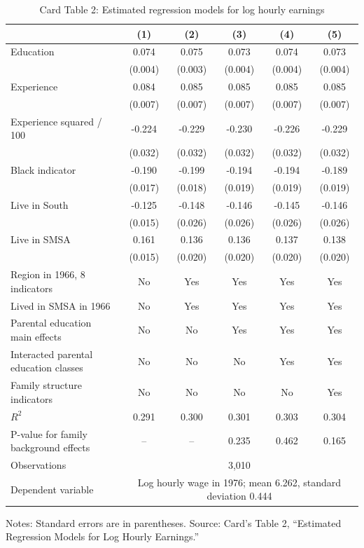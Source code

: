 \documentclass[11pt,a4paper]{article}
\begin{document}
\begin{table}[h!]
\centering
\caption{Card Table 2: Estimated regression models for log hourly earnings}
\begin{threeparttable}
\small
\begin{tabular}{lccccc}
\toprule
 & (1) & (2) & (3) & (4) & (5) \\
\midrule
Education & 0.074 & 0.075 & 0.073 & 0.074 & 0.073 \\
 & (0.004) & (0.003) & (0.004) & (0.004) & (0.004) \\
Experience & 0.084 & 0.085 & 0.085 & 0.085 & 0.085 \\
 & (0.007) & (0.007) & (0.007) & (0.007) & (0.007) \\
Experience squared / 100 & -0.224 & -0.229 & -0.230 & -0.226 & -0.229 \\
 & (0.032) & (0.032) & (0.032) & (0.032) & (0.032) \\
Black indicator & -0.190 & -0.199 & -0.194 & -0.194 & -0.189 \\
 & (0.017) & (0.018) & (0.019) & (0.019) & (0.019) \\
Live in South & -0.125 & -0.148 & -0.146 & -0.145 & -0.146 \\
 & (0.015) & (0.026) & (0.026) & (0.026) & (0.026) \\
Live in SMSA & 0.161 & 0.136 & 0.136 & 0.137 & 0.138 \\
 & (0.015) & (0.020) & (0.020) & (0.020) & (0.020) \\
\midrule
Region in 1966, 8 indicators & No & Yes & Yes & Yes & Yes \\
Lived in SMSA in 1966 & No & Yes & Yes & Yes & Yes \\
Parental education main effects & No & No & Yes & Yes & Yes \\
Interacted parental education classes & No & No & No & Yes & Yes \\
Family structure indicators & No & No & No & No & Yes \\
\midrule
\(R^2\) & 0.291 & 0.300 & 0.301 & 0.303 & 0.304 \\
P-value for family background effects & -- & -- & 0.235 & 0.462 & 0.165 \\
Observations & \multicolumn{5}{c}{3,010} \\
Dependent variable & \multicolumn{5}{c}{Log hourly wage in 1976; mean 6.262, standard deviation 0.444} \\
\bottomrule
\end{tabular}
\begin{tablenotes}[flushleft]
\footnotesize
\item Notes: Standard errors are in parentheses. Source: Card's Table 2, ``Estimated Regression Models for Log Hourly Earnings.''
\end{tablenotes}
\end{threeparttable}
\end{table}
\end{document}
